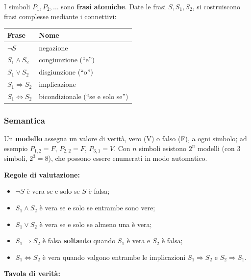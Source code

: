 \documentclass[11pt, a4paper]{article}
\newcommand{\intest}[1]{\textcolor{verde}{\sffamily\bfseries #1}}
\newcommand{\vero}{\textcolor{verde}{V}}
\newcommand{\falso}{\textcolor{tenue}{F}}
\begin{document}
I simboli $P_1, P_2, \dots$ sono \textbf{frasi atomiche}. Date le frasi $S, S_1, S_2$, si costruiscono frasi complesse mediante i connettivi:

\begin{center}
  \renewcommand{\arraystretch}{1.25}
  \begin{tabular}{l l}
    \toprule
    \intest{Frase} & \intest{Nome} \\
    \midrule
    $\lnot S$ & negazione \\
    $S_1 \land S_2$ & congiunzione (``e'') \\
    $S_1 \lor S_2$ & disgiunzione (``o'') \\
    $S_1 \Rightarrow S_2$ & implicazione \\
    $S_1 \Leftrightarrow S_2$ & bicondizionale (``se e solo se'') \\
    \bottomrule
  \end{tabular}
\end{center}

\subsubsection*{Semantica}

Un \textbf{modello} assegna un valore di verità, vero (\vero) o falso (\falso), a ogni simbolo; ad esempio $P_{1,2}=F$, $P_{2,2}=F$, $P_{3,1}=V$. Con $n$ simboli esistono $2^n$ modelli (con 3 simboli, $2^3 = 8$), che possono essere enumerati in modo automatico.

\textbf{Regole di valutazione:}
\begin{itemize}
  \item $\lnot S$ è vera se e solo se $S$ è falsa;
  \item $S_1 \land S_2$ è vera se e solo se entrambe sono vere;
  \item $S_1 \lor S_2$ è vera se e solo se almeno una è vera;
  \item $S_1 \Rightarrow S_2$ è falsa \textbf{soltanto} quando $S_1$ è vera e $S_2$ è falsa;
  \item $S_1 \Leftrightarrow S_2$ è vera quando valgono entrambe le implicazioni $S_1 \Rightarrow S_2$ e $S_2 \Rightarrow S_1$.
\end{itemize}

\textbf{Tavola di verità:}
\end{document}

